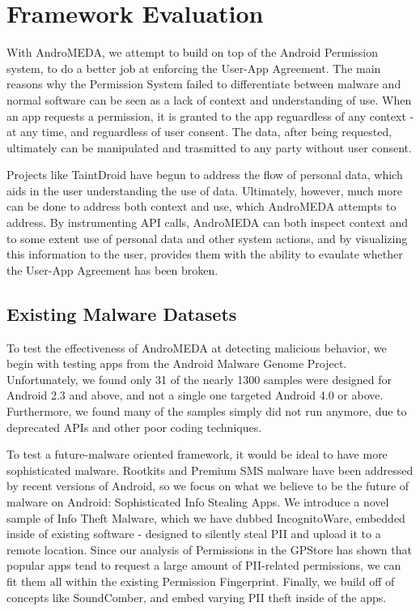 \chapter{Framework Evaluation}
\label{sec:framework}

With AndroMEDA, we attempt to build on top of the Android Permission system, to do a better job at enforcing the User-App Agreement. The main reasons why the Permission System failed to differentiate between malware and normal software can be seen as a lack of context and understanding of use. When an app requests a permission, it is granted to the app reguardless of any context - at any time, and reguardless of user consent. The data, after being requested, ultimately can be manipulated and trasmitted to any party without user consent. 

Projects like TaintDroid\citep{enck2010taintdroid} have begun to address the flow of personal data, which aids in the user understanding the use of data. Ultimately, however, much more can be done to address both context and use, which AndroMEDA attempts to address. By instrumenting API calls, AndroMEDA can both inspect context and to some extent use of personal data and other system actions, and by visualizing this information to the user, provides them with the ability to evaulate whether the User-App Agreement has been broken.

\section{Existing Malware Datasets}
To test the effectiveness of AndroMEDA at detecting malicious behavior, we begin with testing apps from the Android Malware Genome Project\citep{zhou2012dissecting}. Unfortunately, we found only 31 of the nearly 1300 samples were designed for Android 2.3 and above, and not a single one targeted Android 4.0 or above. Furthermore, we found many of the samples simply did not run anymore, due to deprecated APIs and other poor coding techniques. 

To test a future-malware oriented framework, it would be ideal to have more sophisticated malware. Rootkits and Premium SMS malware have been addressed by recent versions of Android, so we focus on what we believe to be the future of malware on Android: Sophisticated Info Stealing Apps. We introduce a novel sample of Info Theft Malware, which we have dubbed IncognitoWare, embedded inside of existing software - designed to silently steal PII and upload it to a remote location. Since our analysis of Permissions in the GPStore has shown that popular apps tend to request a large amount of PII-related permissions, we can fit them all within the existing Permission Fingerprint. Finally, we build off of concepts like SoundComber\citep{schlegel2011soundcomber}, and embed varying PII theft inside of the apps.

